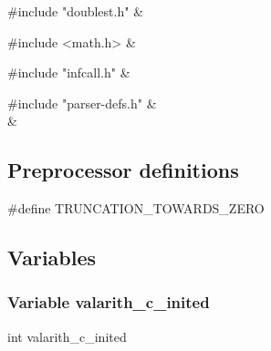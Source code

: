 \medskip
\begin{cxreftabi}
{\stt \#include "doublest.h"} &\\
\end{cxreftabi}

\medskip
\begin{cxreftabi}
{\stt \#include <math.h>} &\\
\end{cxreftabi}

\medskip
\begin{cxreftabi}
{\stt \#include "infcall.h"} &\\
\end{cxreftabi}

\medskip
\begin{cxreftabi}
{\stt \#include "parser-defs.h"} &\\
\hspace*{0.2in}{\stt \#include "doublest.h"} &\\
\end{cxreftabi}


\subsection*{Preprocessor definitions}

{\stt \#define TRUNCATION\_TOWARDS\_ZERO}


\subsection{Variables}


\subsubsection{Variable valarith\_c\_inited}
\label{var_valarith_c_inited_valarith.c}

{\stt int valarith\_c\_inited}

